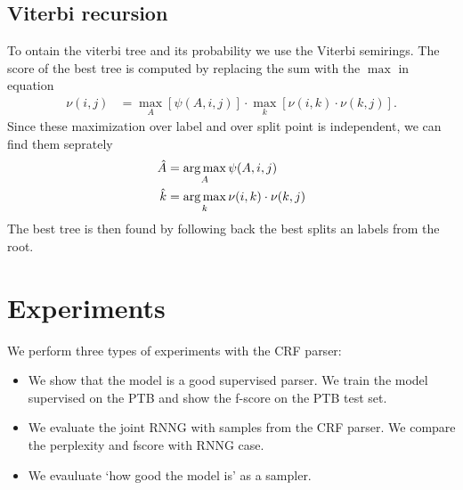 \subsection{Viterbi recursion}
  To ontain the viterbi tree and its probability we use the Viterbi semirings. The score of the best tree is computed by replacing the sum with the $\max$ in equation
  \begin{align}
  \label{eq:viterbi-score}
    \nu(i,j)
      &= \max_{A} [ \psi(A, i, j) ] \cdot \max_{k} [\nu(i,k) \cdot \nu(k,j)].
  \end{align}
  Since these maximization over label and over split point is independent, we can find them seprately
  \begin{align}
  \label{eq:viterbi-tree}
    \hat{A} &= \operatorname*{arg\,max}_{ A  } \psi(A, i, j)  \\
    \hat{k} &= \operatorname*{arg\,max}_{ k } \nu(i, k) \cdot \nu(k, j)
  \end{align}
  The best tree is then found by following back the best splits an labels from the root.


\section{Experiments}
  We perform three types of experiments with the CRF parser:
  \begin{itemize}
    \item We show that the model is a good supervised parser. We train the model supervised on the PTB and show the f-score on the PTB test set.
    \item We evaluate the joint RNNG with samples from the CRF parser. We compare the perplexity and fscore with RNNG case.
    \item We evauluate `how good the model is' as a sampler.
  \end{itemize}

